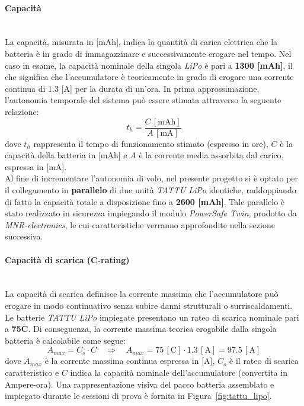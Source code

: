 \documentclass[11pt]{report}
\begin{document}
	\paragraph{Capacità}\mbox{}\\
	La capacità, misurata in [mAh], indica la quantità di carica elettrica che la batteria è in grado di immagazzinare e successivamente erogare nel tempo. Nel caso in esame, la capacità nominale della singola \textit{LiPo} è pari a \textbf{1300 [mAh]}, il che significa che l'accumulatore è teoricamente in grado di erogare una corrente continua di 1.3 [A] per la durata di un'ora. In prima approssimazione, l'autonomia temporale del sistema può essere stimata attraverso la seguente relazione:
	\begin{equation}
		t_h = \frac{C\,[\textrm{mAh}]}{A\,[\textrm{mA}]}
		\label{eq:autonomia_batteria}
	\end{equation}
	dove $t_h$ rappresenta il tempo di funzionamento stimato (espresso in ore), $C$ è la capacità della batteria in [mAh] e $A$ è la corrente media assorbita dal carico, espressa in [mA].\\
	Al fine di incrementare l'autonomia di volo, nel presente progetto si è optato per il collegamento in \textbf{parallelo} di due unità \textit{TATTU LiPo} identiche, raddoppiando di fatto la capacità totale a disposizione fino a \textbf{2600 [mAh]}. Tale parallelo è stato realizzato in sicurezza impiegando il modulo \textit{PowerSafe Twin}, prodotto da \textit{MNR-electronics}, le cui caratteristiche verranno approfondite nella sezione successiva.
	
	\paragraph{Capacità di scarica (C-rating)}\mbox{}\\
	La capacità di scarica definisce la corrente massima che l'accumulatore può erogare in modo continuativo senza subire danni strutturali o surriscaldamenti. Le batterie \textit{TATTU LiPo} impiegate presentano un rateo di scarica nominale pari a \textbf{75C}. Di conseguenza, la corrente massima teorica erogabile dalla singola batteria è calcolabile come segue:
	\begin{equation}
		A_{max} = C_s \cdot C \quad \Rightarrow \quad A_{max} = 75\,[\textrm{C}] \cdot 1.3\,[\textrm{A}] = 97.5\,[\textrm{A}]
		\label{eq:c_rating}
	\end{equation}
	dove $A_{max}$ è la corrente massima continua espressa in [A], $C_s$ è il rateo di scarica caratteristico e $C$ indica la capacità nominale dell'accumulatore (convertita in Ampere-ora). Una rappresentazione visiva del pacco batteria assemblato e impiegato durante le sessioni di prova è fornita in Figura~\ref{fig:tattu_lipo}.
	
\end{document}
